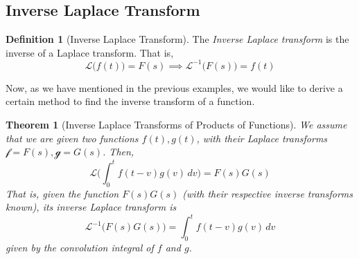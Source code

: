 \documentclass{article}
\newtheorem{theorem}{Theorem}[section]
\theoremstyle{remark}
\theoremstyle{definition}
\newtheorem{definition}{Definition}[section]
\begin{document}
  \subsection{Inverse Laplace Transform}

    \begin{definition}[Inverse Laplace Transform]
    The \textit{Inverse Laplace transform} is the inverse of a Laplace transform. That is, 
    \[\mathcal{L}\big( f(t)\big) = F(s) \implies  \mathcal{L}^{-1} \big(F(s)\big) = f(t)\]
    \end{definition}

    Now, as we have mentioned in the previous examples, we would like to derive a certain method to find the inverse transform of a function. 

    \begin{theorem}[Inverse Laplace Transforms of Products of Functions]
    We assume that we are given two functions $f(t), g(t)$, with their Laplace transforms $\mathcal{f} = F(s), \mathcal{g} = G(s)$. Then, 
    \[\mathcal{L}\bigg(\int_0^t f(t-v) g(v)\,dv \bigg) = F(s)G(s)\]
    That is, given the function $F(s) G(s)$ (with their respective inverse transforms known), its inverse Laplace transform is
    \[\mathcal{L}^{-1} \big( F(s) G(s)\big) = \int_0^t f(t-v) g(v)\,dv\]
    given by the convolution integral of $f$ and $g$. 
    \end{theorem}
\end{document}
